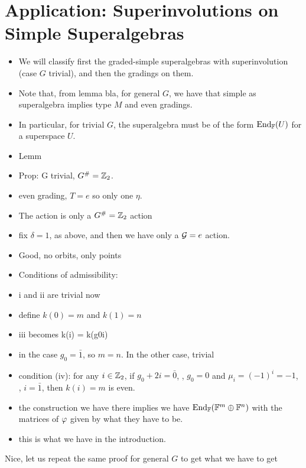\section{Application: Superinvolutions on Simple Superalgebras}

\begin{itemize}
    \item We will classify first the graded-simple superalgebras with superinvolution (case $G$ trivial), and then the gradings on them.
    \item Note that, from lemma bla, for general $G$, we have that simple as superalgebra implies type $M$ and even gradings.
    \item In particular, for trivial $G$, the superalgebra must be of the form $\operatorname{End}_{\mathbb{F}} (U)$ for a superspace $U$.
    \item Lemm
    \item Prop: G trivial, $G^\# = \mathbb{Z}_2$.
    \item even grading, $T = e$ so only one $\eta$.
    \item The action is only a $G^\# = \mathbb{Z}_2$ action
    \item fix $\delta = 1$, as above, and then we have only a $\mathcal G = e$ action.
    \item Good, no orbits, only points
    \item Conditions of admissibility:
    \item i and ii are trivial now
    \item define $k(0) = m$ and $k(1) = n$
    \item iii becomes k(i) = k(g0i)
    \item in the case $g_0 = \bar 1$, so $m = n$. In the other case, trivial
    \item condition (iv): for any $i \in \mathbb{Z}_2$, if $g_0 + 2i = \bar 0$, \ie, $g_0 = 0$ and $\mu_i = (-1)^{i} = -1$, \ie, $i = \bar 1$, then $k(i) = m$ is even.
    \item the construction we have there implies we have $\operatorname{End}_{\mathbb{F}} (\mathbb{F}^m \oplus \mathbb{F}^n)$ with the matrices of $\varphi$ given by what they have to be.
    \item this is what we have in the introduction.
\end{itemize}

Nice, let us repeat the same proof for general $G$ to get what we have to get

